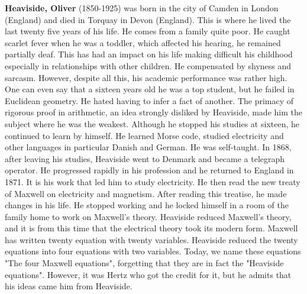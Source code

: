\textbf{Heaviside, Oliver} (1850-1925) was born in the city of Camden in London (England) and died in Torquay in Devon (England). This is where he lived the last twenty five years of his life. He comes from a family quite poor. He caught scarlet fever when he was a toddler, which affected his hearing, he remained partially deaf. This has had an impact on his life making difficult his childhood especially in relationships with other children. He compensated by shyness and sarcasm. However, despite all this, his academic performance was rather high. One can even say that a sixteen years old he was a top student, but he failed in Euclidean geometry. He hated having to infer a fact of another. The primacy of rigorous proof in arithmetic, an idea strongly disliked by Heaviside, made him the subject where he was the weakest. Although he stopped his studies at sixteen, he continued to learn by himself. He learned Morse code, studied electricity and other languages in particular Danish and German. He was self-taught. In 1868, after leaving his studies, Heaviside went to Denmark and became a telegraph operator. He progressed rapidly in his profession and he returned to England in 1871. It is his work that led him to study electricity. He then read the new treaty of Maxwell on electricity and magnetism. After reading this treatise, he made changes in his life. He stopped working and he locked himself in a room of the family home to work on Maxwell's theory. Heaviside reduced Maxwell's theory, and it is from this time that the electrical theory took its modern form. Maxwell has written twenty equation with twenty variables. Heaviside reduced the twenty equations into four equations with two variables. Today, we name these equations "The four Maxwell equations", forgetting that they are in fact the "Heaviside equations". However, it was Hertz who got the credit for it, but he admits that his ideas came him from Heaviside.


